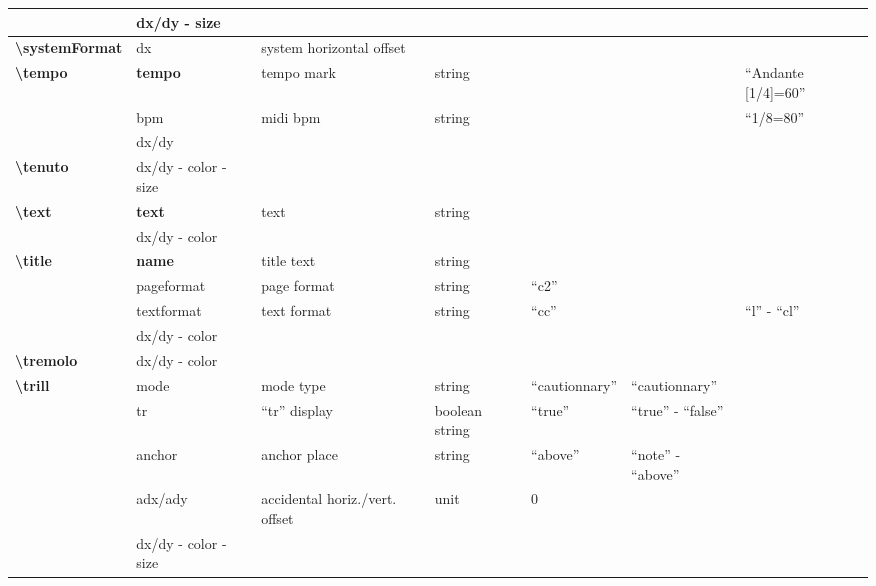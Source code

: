 \documentclass[a4paper, landscape, 10pt]{article}
\begin{document}
\begin{tabularx}{\linewidth}{p{3cm}p{3cm}p{5cm}p{3cm}p{2.5cm}p{3.5cm}p{4cm}}
    &dx/dy - size&&&&&\\
    \hline
    \textbf{\textbackslash{}systemFormat}&dx&system horizontal offset&&&&\\
    \hline
    \textbf{\textbackslash{}tempo}&\textbf{tempo}&tempo mark&string&&&``Andante [1/4]=60''\\
    &bpm&midi bpm&string&&&``1/8=80''\\
    &dx/dy&&&&&\\
    \hline
    \textbf{\textbackslash{}tenuto}&dx/dy - color - size&&&&&\\
    \hline
    \textbf{\textbackslash{}text}&\textbf{text}&text&string&&&\\
    &dx/dy - color&&&&&\\
    \hline
    \textbf{\textbackslash{}title}&\textbf{name}&title text&string&&&\\
    &pageformat&page format&string&``c2''&&\\ %
    &textformat&text format&string&``cc''&&``l'' - ``cl''\\ %
    &dx/dy - color&&&&&\\
    \hline
    \textbf{\textbackslash{}tremolo}&dx/dy - color&&&&&\\
    \hline
    \textbf{\textbackslash{}trill}&mode&mode type&string&``cautionnary''&``cautionnary''&\\
    &tr&``tr'' display&boolean string&``true''&``true'' - ``false''&\\
    &anchor&anchor place&string&``above''&``note'' - ``above''&\\
    &adx/ady&accidental horiz./vert. offset&unit&0&&\\
    &dx/dy - color - size&&&&&\\
    \hline
\end{tabularx}
\end{document}
